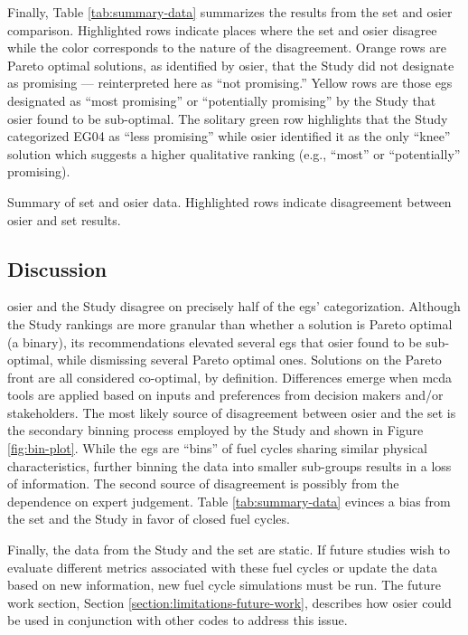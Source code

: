 \noindent
Finally, Table \ref{tab:summary-data} summarizes the results from the \ac{set}
and \ac{osier} comparison. Highlighted rows indicate places where the \ac{set}
and \ac{osier} disagree while the color corresponds to the nature of the
disagreement. Orange rows are Pareto optimal solutions, as identified by
\ac{osier}, that the Study did not designate as promising --- reinterpreted here
as ``not promising.'' Yellow rows are those \acp{eg} designated as ``most
promising'' or ``potentially promising'' by the Study that \ac{osier} found to
be sub-optimal. The solitary green row highlights that the Study categorized
EG04 as ``less promising'' while \ac{osier} identified it as the only ``knee''
solution which suggests a higher qualitative ranking (e.g., ``most'' or
``potentially'' promising). 

\begin{table}[htbp!]
    \centering
    \caption{Summary of \ac{set} and \ac{osier} data. Highlighted rows indicate
    disagreement between \ac{osier} and \ac{set} results.}
    \label{tab:summary-data}
    \resizebox*{\textwidth}{!}{}
\end{table}

\FloatBarrier

\subsection{Discussion}

\ac{osier} and the Study disagree on precisely half of the \acp{eg}'
categorization. Although the Study rankings are more granular than whether a
solution is Pareto optimal (a binary), its recommendations elevated several
\acp{eg} that \ac{osier} found to be sub-optimal, while dismissing several
Pareto optimal ones. Solutions on the Pareto front are all considered
co-optimal, by definition. Differences emerge when \ac{mcda} tools are applied
based on inputs and preferences from decision makers and/or stakeholders. The
most likely source of disagreement between \ac{osier} and the \ac{set} is the
secondary binning process employed by the Study and shown in Figure
\ref{fig:bin-plot}. While the \acp{eg} are ``bins'' of fuel cycles sharing
similar physical characteristics, further binning the data into smaller
sub-groups results in a loss of information. The second source of disagreement
is possibly from the dependence on expert judgement. Table
\ref{tab:summary-data} evinces a bias from the \ac{set} and the Study in favor
of closed fuel cycles.

Finally, the data from the Study and the \ac{set} are static. If future studies
wish to evaluate different metrics associated with these fuel cycles or update
the data based on new information, new fuel cycle simulations must be run. The
future work section, Section \ref{section:limitations-future-work}, describes
how \ac{osier} could be used in conjunction with other codes to address this
issue. 
